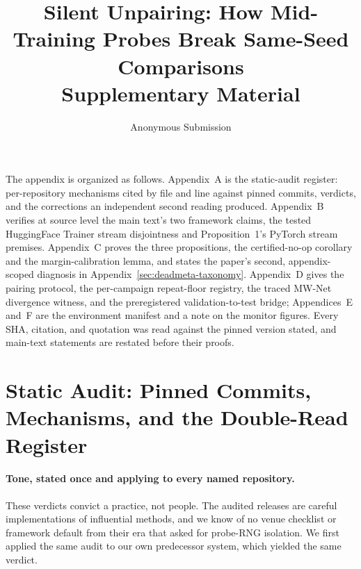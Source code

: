 \documentclass[10pt,letterpaper]{article}
\title{Silent Unpairing: How Mid-Training Probes Break Same-Seed
Comparisons\\[4pt] {\large Supplementary Material}}
\author{Anonymous Submission}
\date{}
\theoremstyle{remark}
\begin{document}
\maketitle

\noindent The appendix is organized as follows. Appendix~A is the static-audit
register: per-repository mechanisms cited by file and line against pinned
commits, verdicts, and the corrections an independent second reading produced.
Appendix~B verifies at source level the main text's two framework claims,
the tested HuggingFace Trainer stream disjointness and Proposition~1's PyTorch stream
premises. Appendix~C proves the three propositions, the certified-no-op corollary and
the margin-calibration lemma, and states the paper's second, appendix-scoped
diagnosis in Appendix~\ref{sec:deadmeta-taxonomy}. Appendix~D gives the pairing
protocol, the per-campaign repeat-floor registry, the traced MW-Net divergence
witness, and the preregistered validation-to-test bridge; Appendices~E and~F
are the environment manifest and a note on the monitor figures. Every SHA,
citation, and quotation was read against the pinned version stated, and
main-text statements are restated before their proofs.

\section{Static Audit: Pinned Commits, Mechanisms, and the Double-Read
Register}
\label{sec:audit}

\paragraph{Tone, stated once and applying to every named repository.}
These verdicts convict a practice, not people. The audited releases are careful
implementations of influential methods, and we know of no venue checklist or
framework default from their era that asked for probe-RNG isolation. We first
applied the same audit to our own predecessor system, which yielded the same
verdict.
\end{document}
